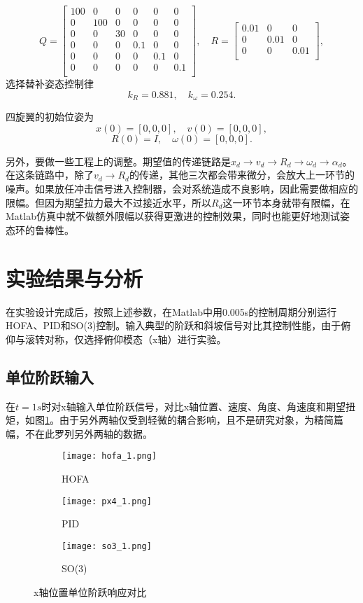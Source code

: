 $$Q=\begin{bmatrix}
  100&0&0&0&0&0\\
  0&100&0&0&0&0\\
  0&0&30&0&0&0\\
  0&0&0&0.1&0&0\\
  0&0&0&0&0.1&0\\
  0&0&0&0&0&0.1\\
\end{bmatrix}, \quad R=\begin{bmatrix}
  0.01 &0 &0\\
  0 &0.01 &0\\
  0 &0 &0.01\\
\end{bmatrix},$$
选择替补姿态控制律
$$k_R=0.881 ,\quad k_\omega=0.254.$$

四旋翼的初始位姿为
$$x(0)=[0,0,0],\quad v(0)=[0,0,0],$$
$$R(0)=I , \quad \omega(0)=[0,0,0].$$

另外，要做一些工程上的调整。期望值的传递链路是$x_d \to v_d \to R_d \to \omega_d \to \alpha_d$。在这条链路中，除了$ v_d \to R_d$的传递，其他三次都会带来微分，会放大上一环节的噪声。如果放任冲击信号进入控制器，会对系统造成不良影响，因此需要做相应的限幅。但因为期望拉力最大不过接近水平，所以$R_d$这一环节本身就带有限幅，在Matlab仿真中就不做额外限幅以获得更激进的控制效果，同时也能更好地测试姿态环的鲁棒性。

\section{实验结果与分析}

  在实验设计完成后，按照上述参数，在Matlab中用0.005s的控制周期分别运行HOFA、PID和SO(3)控制。输入典型的阶跃和斜坡信号对比其控制性能，由于俯仰与滚转对称，仅选择俯仰模态（x轴）进行实验。

\subsection*{单位阶跃输入}

  在$t=1s$时对x轴输入单位阶跃信号，对比x轴位置、速度、角度、角速度和期望扭矩，如图\ref{matlab_阶跃}。由于另外两轴仅受到轻微的耦合影响，且不是研究对象，为精简篇幅，不在此罗列另外两轴的数据。
\newpage
\newpage
\begin{figure}[!htp]
  \centering
  \begin{subfigure}[t]{0.49\textwidth}
    \centering
    \texttt{[image: hofa\_1.png]}
    \caption{HOFA}
  \end{subfigure}\hfill
  \begin{subfigure}[t]{0.49\textwidth}
    \centering
    \texttt{[image: px4\_1.png]}
    \caption{PID}
  \end{subfigure}\hfill
  \begin{subfigure}[t]{0.49\textwidth}
    \centering
    \texttt{[image: so3\_1.png]}
    \caption{SO(3)}
  \end{subfigure}
  \caption{x轴位置单位阶跃响应对比}
  \label{matlab_阶跃}
\end{figure}

